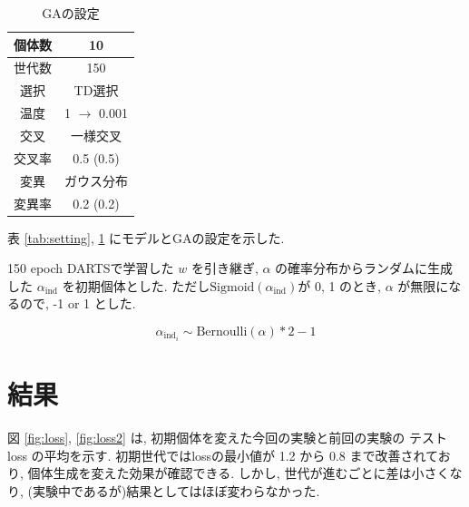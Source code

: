 \documentclass[twocolumn]{jarticle}     %
\begin{document}
\begin{table}[tb]
  \begin{center}
    \caption{GAの設定}
    \begin{tabular}{|c|c|} \hline
      個体数 & 10 \\ \hline
      世代数 & 150 \\ \hline \hline
      選択 & TD選択 \\ \hline
      温度 & 1 $\rightarrow$ 0.001 \\ \hline \hline
      交叉 & 一様交叉 \\ \hline
      交叉率 & 0.5 (0.5) \\ \hline \hline
      変異 & ガウス分布 \\ \hline
      変異率 & 0.2 (0.2) \\ \hline
    \end{tabular}
    \label{tab:setting_ga}
  \end{center}
\end{table}

表 \ref{tab:setting}, \ref{tab:setting_ga} にモデルとGAの設定を示した.

150 epoch DARTSで学習した $w$ を引き継ぎ, $\alpha$ の確率分布からランダムに生成した $\alpha_{\mathrm{ind}}$ を初期個体とした.
ただし$\mathrm{Sigmoid}(\alpha_{\mathrm{ind}})$が 0, 1 のとき, $\alpha$ が無限になるので, -1 or 1 とした.

\begin{equation}
  \alpha_{\mathrm{ind}_i} \sim \mathrm{Bernoulli} (\alpha) * 2 - 1
\end{equation}

\section{結果}


%
図 \ref{fig:loss}, \ref{fig:loss2} は, 初期個体を変えた今回の実験と前回の実験の テスト loss の平均を示す.
初期世代ではlossの最小値が 1.2 から 0.8 まで改善されており, 個体生成を変えた効果が確認できる.
しかし, 世代が進むごとに差は小さくなり, (実験中であるが)結果としてはほぼ変わらなかった.
%
\end{document}
